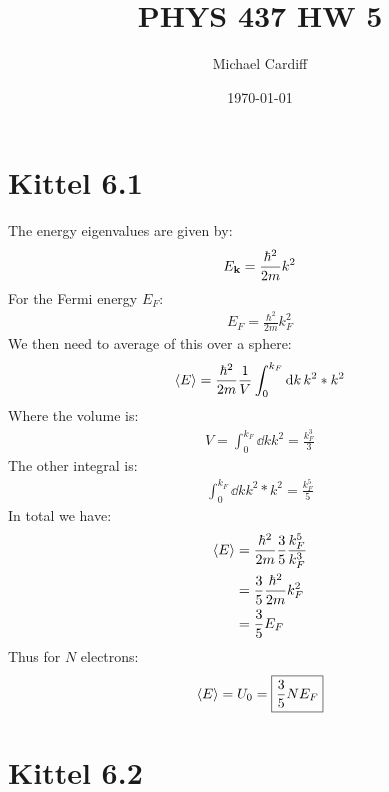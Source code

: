 \documentclass[12pt]{article}
\title{\vspace{-3em}PHYS 437 HW 5}
\author{Michael Cardiff}
\date{\today}
\begin{document}
\maketitle
\section*{Kittel 6.1}
The energy eigenvalues are given by:
\begin{align*}
  E_{\vb{k}}=\frac{\hbar^2}{2m}k^2
\end{align*}
For the Fermi energy $E_F$:
\begin{align*}
  E_F=\frac{\hbar^2}{2m}k^2_F
\end{align*}
We then need to average of this over a sphere:
\begin{align*}
  \ev{E}=\frac{\hbar^2}{2m}\frac{1}{V}\int_0^{k_F}\dd{k}k^2*k^2
\end{align*}
Where the volume is:
\begin{align*}
  V=\int_0^{k_F}\dd{k}k^2=\frac{k_F^3}{3}
\end{align*}
The other integral is:
\begin{align*}
  \int_0^{k_F}\dd{k}k^2*k^2=\frac{k_F^5}{5}
\end{align*}
In total we have:
\begin{align*}
  \ev{E}&=\frac{\hbar^2}{2m}\frac{3}{5}\frac{k_F^5}{k_F^3}\\
  &=\frac{3}{5}\frac{\hbar^2}{2m}k_F^2\\
  &=\frac{3}{5}E_F
\end{align*}
Thus for $N$ electrons:
\begin{align*}
  \ev{E}=U_0=\boxed{\frac{3}{5}NE_F}
\end{align*}
\section*{Kittel 6.2}
\end{document}
